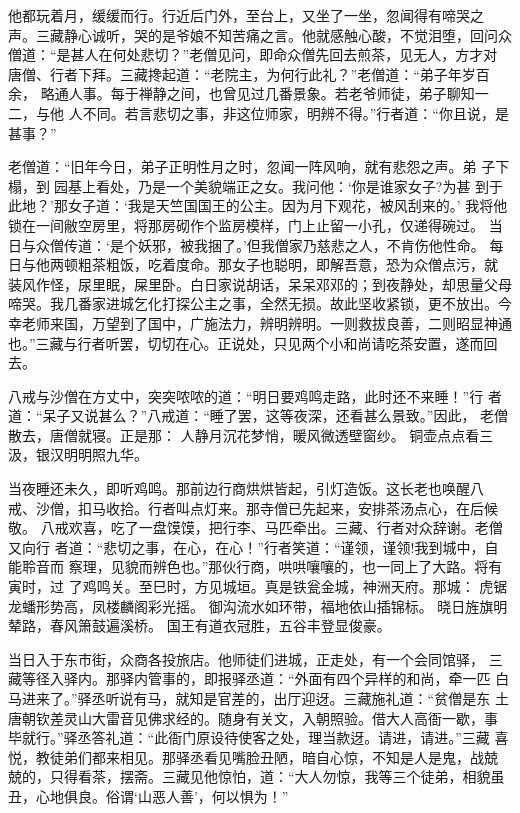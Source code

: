 他都玩着月，缓缓而行。行近后门外，至台上，又坐了一坐，忽闻得有啼哭之
声。三藏静心诚听，哭的是爷娘不知苦痛之言。他就感触心酸，不觉泪堕，回问众
僧道：“是甚人在何处悲切？”老僧见问，即命众僧先回去煎茶，见无人，方才对
唐僧、行者下拜。三藏搀起道：“老院主，为何行此礼？”老僧道：“弟子年岁百余，
略通人事。每于禅静之间，也曾见过几番景象。若老爷师徒，弟子聊知一二，与他
人不同。若言悲切之事，非这位师家，明辨不得。”行者道：“你且说，是甚事？”

老僧道：“旧年今日，弟子正明性月之时，忽闻一阵风响，就有悲怨之声。弟
子下榻，到园基上看处，乃是一个美貌端正之女。我问他：‘你是谁家女子?为甚
到于此地？’那女子道：‘我是天竺国国王的公主。因为月下观花，被风刮来的。’
我将他锁在一间敝空房里，将那房砌作个监房模样，门上止留一小孔，仅递得碗过。
当日与众僧传道：‘是个妖邪，被我捆了。’但我僧家乃慈悲之人，不肯伤他性命。
每日与他两顿粗茶粗饭，吃着度命。那女子也聪明，即解吾意，恐为众僧点污，就
装风作怪，尿里眠，屎里卧。白日家说胡话，呆呆邓邓的；到夜静处，却思量父母
啼哭。我几番家进城乞化打探公主之事，全然无损。故此坚收紧锁，更不放出。今
幸老师来国，万望到了国中，广施法力，辨明辨明。一则救拔良善，二则昭显神通
也。”三藏与行者听罢，切切在心。正说处，只见两个小和尚请吃茶安置，遂而回
去。

八戒与沙僧在方丈中，突突哝哝的道：“明日要鸡鸣走路，此时还不来睡！”行
者道：“呆子又说甚么？”八戒道：“睡了罢，这等夜深，还看甚么景致。”因此，
老僧散去，唐僧就寝。正是那：
人静月沉花梦悄，暖风微透壁窗纱。
铜壶点点看三汲，银汉明明照九华。

当夜睡还未久，即听鸡鸣。那前边行商烘烘皆起，引灯造饭。这长老也唤醒八
戒、沙僧，扣马收拾。行者叫点灯来。那寺僧已先起来，安排茶汤点心，在后候敬。
八戒欢喜，吃了一盘馍馍，把行李、马匹牵出。三藏、行者对众辞谢。老僧又向行
者道：“悲切之事，在心，在心！”行者笑道：“谨领，谨领!我到城中，自能聆音而
察理，见貌而辨色也。”那伙行商，哄哄嚷嚷的，也一同上了大路。将有寅时，过
了鸡鸣关。至巳时，方见城垣。真是铁瓮金城，神洲天府。那城：
虎锯龙蟠形势高，凤楼麟阁彩光摇。
御沟流水如环带，福地依山插锦标。
晓日旌旗明辇路，春风箫鼓遍溪桥。
国王有道衣冠胜，五谷丰登显俊豪。

当日入于东市街，众商各投旅店。他师徒们进城，正走处，有一个会同馆驿，
三藏等径入驿内。那驿内管事的，即报驿丞道：“外面有四个异样的和尚，牵一匹
白马进来了。”驿丞听说有马，就知是官差的，出厅迎迓。三藏施礼道：“贫僧是东
土唐朝钦差灵山大雷音见佛求经的。随身有关文，入朝照验。借大人高衙一歇，事
毕就行。”驿丞答礼道：“此衙门原设待使客之处，理当款迓。请进，请进。”三藏
喜悦，教徒弟们都来相见。那驿丞看见嘴脸丑陋，暗自心惊，不知是人是鬼，战兢
兢的，只得看茶，摆斋。三藏见他惊怕，道：“大人勿惊，我等三个徒弟，相貌虽
丑，心地俱良。俗谓‘山恶人善’，何以惧为！”


